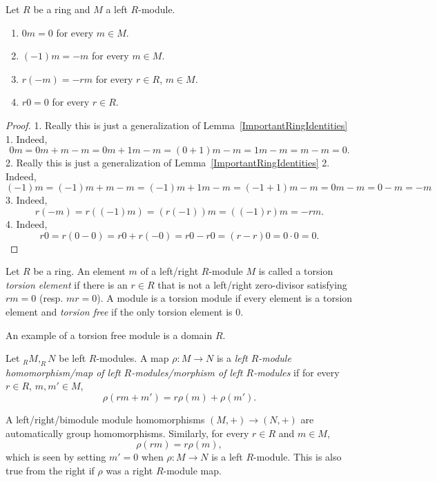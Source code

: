 \begin{lemma}
    Let $R$ be a ring and $M$ a left $R$-module. 
    \begin{enumerate}
        \item $0m = 0$ for every $m\in M$.
        \item $(-1)m = -m$ for every $m\in M$.
        \item $r(-m) = -rm$ for every $r\in R$, $m\in M$.
        \item $r0 = 0$ for every $r\in R$.
    \end{enumerate}
\end{lemma}
\begin{proof}
    1. Really this is just a generalization of Lemma~\ref{ImportantRingIdentities} 1. Indeed,
    $$0m = 0m + m -m = 0m+1m-m = (0+1)m-m = 1m -m =m-m = 0.$$
    2. Really this is just a generalization of Lemma~\ref{ImportantRingIdentities} 2. Indeed,
    $$(-1)m=(-1)m +m-m = (-1)m+1m-m = (-1+1)m-m = 0m-m=0-m=-m$$
    3. Indeed,
    $$r(-m) = r((-1)m) = (r(-1))m=((-1)r)m=-rm.$$
    4. Indeed,
    $$r0 = r(0-0)=r0+r(-0)=r0-r0=(r-r)0=0\cdot 0 = 0.$$
\end{proof}
\begin{definition}
    Let $R$ be a ring. An element $m$ of a left/right $R$-module $M$ is called a torsion \textit{torsion element} if there is an $r\in R$  that is not a left/right zero-divisor satisfying $rm =0$ (resp. $mr=0$). A module is a torsion module if every element is a torsion element and \textit{torsion free} if the only torsion element is $0$.
\end{definition}
\begin{remark}
    An example of a torsion free module is a domain $R$.
\end{remark}
\begin{definition}
    Let $_RM, _RN$ be left $R$-modules. A map $\rho : M \rightarrow N$ is a \textit{left $R$-module homomorphism/map of left $R$-modules/morphism of left $R$-modules} if for every $r\in R$, $m,m'\in M$,
    $$\rho(rm+m') = r\rho(m)+\rho(m').$$
\end{definition}
\begin{remark}
    A left/right/bimodule module homomorphisms $(M,+)\rightarrow (N,+)$ are automatically group homomorphisms. Similarly, for every $r\in R$ and $m\in M$,
    $$\rho(rm) = r\rho(m),$$
    which is seen by setting $m' = 0$ when $\rho: M\rightarrow N$ is a left $R$-module. This is also true from the right if $\rho$ was a right $R$-module map.
\end{remark}
